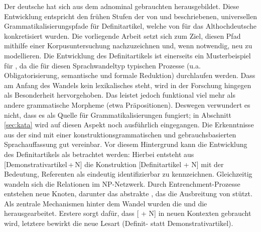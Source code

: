 Der deutsche  hat sich aus dem adnominal gebrauchten   herausgebildet. Diese Entwicklung entspricht den frühen Stufen der von \textcite{Greenberg1978} und \textcite{Lehmann2015} beschriebenen, universellen Grammatikalisierungspfade  für Definitartikel, welche von \textcite{Schmuck2014} für das Althochdeutsche konkretisiert wurden. Die vorliegende Arbeit setzt sich zum Ziel, diesen Pfad mithilfe einer Korpusuntersuchung  nachzuzeichnen und, wenn notwendig, neu zu modellieren. Die Entwicklung  des Definitartikels ist einerseits ein Musterbeispiel für , da die für diesen Sprachwandeltyp typischen Prozesse (u.a. Obligatorisierung, semantische und formale Reduktion)  durchlaufen werden. Dass am Anfang des Wandels kein lexikalisches  steht, wird in der Forschung hingegen als Besonderheit hervorgehoben. Das  leistet jedoch funktional viel mehr als andere grammatische Morpheme  (etwa Präpositionen). Deswegen verwundert es nicht, dass es als Quelle für Grammatikalisierungen  fungiert; in Abschnitt \ref{sec:kata} wird auf diesen Aspekt noch ausführlich eingegangen. Die Erkenntnisse aus der  sind mit einer konstruktionsgrammatischen  und gebrauchsbasierten Sprachauffassung gut vereinbar. Vor diesem Hintergrund kann die Entwicklung des Definitartikels als  betrachtet werden: Hierbei entsteht aus [Demonstrativartikel\,+\,N] die Konstruktion   [Definitartikel + N] mit der Bedeutung, Referenten als eindeutig identifizierbar zu kennzeichnen. Gleichzeitig wandeln sich die Relationen im NP-Netzwerk. Durch Entrenchment-Prozesse  entstehen neue Knoten, darunter das abstrakte , das die Ausbreitung von  stützt. Als zentrale Mechanismen hinter dem Wandel wurden die  und die  herausgearbeitet. Erstere sorgt dafür, dass [ + N] in neuen Kontexten gebraucht wird, letztere bewirkt die neue Lesart (Definit- statt Demonstrativartikel). 
